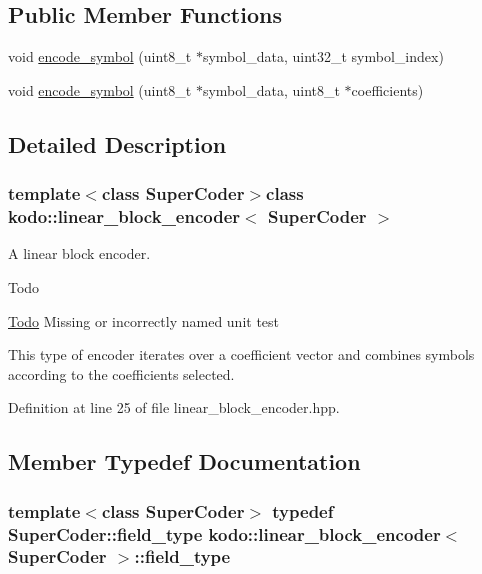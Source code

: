 \subsection*{Public Member Functions}
\begin{DoxyCompactItemize}
\item 
void \hyperlink{classkodo_1_1linear__block__encoder_af6019ba14fe8cc01e44fe73d387c1e2c}{encode\-\_\-symbol} (uint8\-\_\-t $\ast$symbol\-\_\-data, uint32\-\_\-t symbol\-\_\-index)
\begin{DoxyCompactList}\small\item\em \end{DoxyCompactList}\item 
void \hyperlink{classkodo_1_1linear__block__encoder_a0190c72d3e9255c5b16bd4cbe659f55e}{encode\-\_\-symbol} (uint8\-\_\-t $\ast$symbol\-\_\-data, uint8\-\_\-t $\ast$coefficients)
\begin{DoxyCompactList}\small\item\em \end{DoxyCompactList}\end{DoxyCompactItemize}


\subsection{Detailed Description}
\subsubsection*{template$<$class Super\-Coder$>$class kodo\-::linear\-\_\-block\-\_\-encoder$<$ Super\-Coder $>$}

A linear block encoder. 

\begin{DoxyRefDesc}{Todo}
\item[\hyperlink{todo__todo000023}{Todo}]Missing or incorrectly named unit test\end{DoxyRefDesc}
This type of encoder iterates over a coefficient vector and combines symbols according to the coefficients selected. 

Definition at line 25 of file linear\-\_\-block\-\_\-encoder.\-hpp.



\subsection{Member Typedef Documentation}
\hypertarget{classkodo_1_1linear__block__encoder_a92a5f9946dea7a5cdcf84f36941ec23c}{
\subsubsection[{field\-\_\-type}]{\setlength{\rightskip}{0pt plus 5cm}template$<$class Super\-Coder$>$ typedef Super\-Coder\-::field\-\_\-type {\bf kodo\-::linear\-\_\-block\-\_\-encoder}$<$ Super\-Coder $>$\-::{\bf field\-\_\-type}}}\label{classkodo_1_1linear__block__encoder_a92a5f9946dea7a5cdcf84f36941ec23c}




